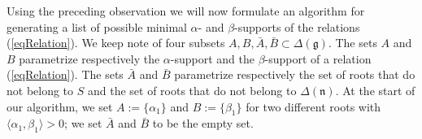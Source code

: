 \documentclass[12pt]{report}
\newcommand{\nn}{\mathfrak{n}}
\newcommand{\gG}{\mathfrak{g}}
\newcommand{\refeq}[1]{(\ref{#1})}
\begin{document}
Using the preceding observation we will now formulate an algorithm for generating a list of possible minimal $\alpha$- and $\beta$-supports of the relations \refeq{eqRelation}. We keep note of four subsets $A,B,\bar A, \bar B \subset \Delta (\gG)$. The sets $A$ and $B$ parametrize respectively the $\alpha$-support and the $\beta$-support of a relation (\ref{eqRelation}). The sets $\bar A$ and $\bar B$ parametrize respectively the set of roots that do not belong to $S$ and the set of roots that do not belong to $\Delta(\nn)$. At the start of our algorithm, we set $A:=\{\alpha_1\}$ and $B:=\{\beta_1\}$ for two different roots with $\langle\alpha_1, \beta_1 \rangle >0$; we set $\bar A$ and $\bar B$ to be the empty set.
\end{document}
